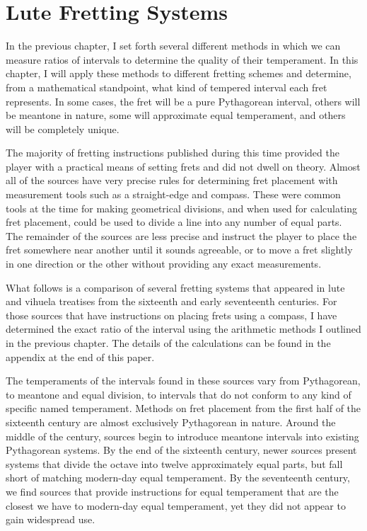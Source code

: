 
\chapter{Lute Fretting Systems}

In the previous chapter, I set forth several different methods in which we can measure
ratios of intervals to determine the quality of their temperament.  In this chapter, I
will apply these methods to different fretting schemes and determine, from a mathematical
standpoint, what kind of tempered interval each fret represents.  In some cases, the fret
will be a pure Pythagorean interval, others will be meantone in nature, some will
approximate equal temperament, and others will be completely unique.

The majority of fretting instructions published during this time provided the player with
a practical means of setting frets and did not dwell on theory.  Almost all of the sources
have very precise rules for determining fret placement with measurement tools such as a
straight-edge and compass.  These were common tools at the time for making geometrical
divisions, and when used for calculating fret placement, could be used to divide a line
into any number of equal parts.  The remainder of the sources are less precise and
instruct the player to place the fret somewhere near another until it sounds agreeable, or
to move a fret slightly in one direction or the other without providing any exact
measurements.

What follows is a comparison of several fretting systems that appeared in lute and vihuela
treatises from the sixteenth and early seventeenth centuries. For those sources that have
instructions on placing frets using a compass, I have determined the exact ratio of the
interval using the arithmetic methods I outlined in the previous chapter.  The details of
the calculations can be found in the appendix at the end of this paper.

The temperaments of the intervals found in these sources vary from Pythagorean, to
meantone and equal division, to intervals that do not conform to any kind of specific
named temperament. Methods on fret placement from the first half of the sixteenth century
are almost exclusively Pythagorean in nature.  Around the middle of the century, sources
begin to introduce meantone intervals into existing Pythagorean systems.  By the end of
the sixteenth century, newer sources present systems that divide the octave into twelve
approximately equal parts, but fall short of matching modern-day equal temperament.  By
the seventeenth century, we find sources that provide instructions for equal temperament
that are the closest we have to modern-day equal temperament, yet they did not appear to
gain widespread use.

